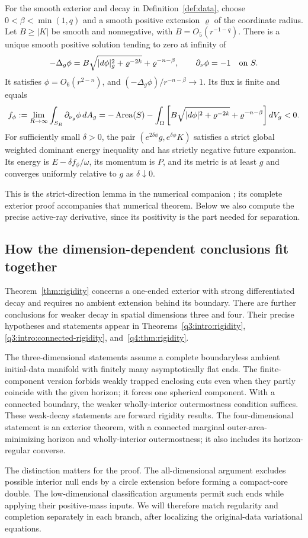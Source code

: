 \begin{lemma}\label{lem:strict-input}
For the smooth exterior and decay in Definition~\ref{def:data}, choose
$0<\beta<\min(1,q)$ and a smooth positive extension $\varrho$ of the
coordinate radius. Let $B\geq|K|$ be smooth and nonnegative, with
$B=O_5(r^{-1-q})$. There is a unique smooth positive solution tending
to zero at infinity of
\[
 -\Delta_g\phi=B\sqrt{|d\phi|_g^2+\varrho^{-2k}}
                    +\varrho^{-n-\beta},\qquad
 \partial_\nu\phi=-1\quad\hbox{on }S.
\]
It satisfies $\phi=O_6(r^{2-n})$, and
$(-\Delta_g\phi)/r^{-n-\beta}\to1$. Its flux is finite and equals
\[
 f_\phi:=\lim_{R\to\infty}\int_{S_R}\partial_{\nu_g}\phi\,dA_g
 =-\operatorname{Area}(S)-\int_\Omega
 \left[B\sqrt{|d\phi|^2+\varrho^{-2k}}+\varrho^{-n-\beta}\right]dV_g<0.
\]
For sufficiently small $\delta>0$, the pair
$(e^{2\delta\phi}g,e^{\delta\phi}K)$ satisfies a strict global
weighted dominant energy inequality and has strictly negative future
expansion. Its energy is $E-\delta f_\phi/\omega$, its momentum is
$P$, and its metric is at least $g$ and converges uniformly relative
to $g$ as $\delta\downarrow0$.
\end{lemma}

This is the strict-direction lemma in the numerical companion
\cite[Lemma~3.5]{CompanionNumerical}; its
complete exterior proof accompanies that numerical theorem. Below we
also compute the precise active-ray derivative, since its positivity
is the part needed for separation.

\subsection{How the dimension-dependent conclusions fit together}

Theorem~\ref{thm:rigidity} concerns a one-ended exterior with strong
differentiated decay and requires no ambient extension behind its
boundary. There are further conclusions for weaker decay in spatial
dimensions three and four. Their precise hypotheses and statements
appear in Theorems~\ref{q3:intro:rigidity},
\ref{q3:intro:connected-rigidity}, and~\ref{q4:thm:rigidity}.

The three-dimensional statements assume a complete boundaryless
ambient initial-data manifold with finitely many asymptotically flat
ends. The finite-component version forbids weakly trapped enclosing
cuts even when they partly coincide with the given horizon; it forces
one spherical component. With a connected boundary, the weaker
wholly-interior outermostness condition suffices. These weak-decay
statements are forward rigidity results. The four-dimensional
statement is an exterior theorem, with a connected marginal
outer-area-minimizing horizon and wholly-interior outermostness; it
also includes its horizon-regular converse.

The distinction matters for the proof. The all-dimensional argument
excludes possible interior null ends by a circle extension before
forming a compact-core double. The low-dimensional classification
arguments permit such ends while applying their positive-mass inputs.
We will therefore match regularity and completion separately in each
branch, after localizing the original-data variational equations.
